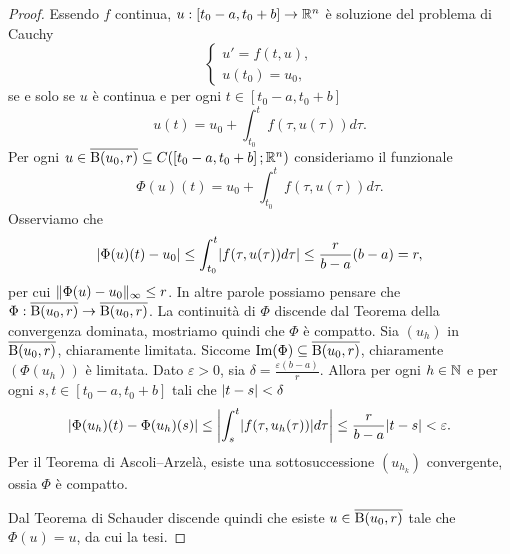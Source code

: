 \begin{proof}
	Essendo $f$ continua, $u: \left[t_{0} - a,t_{0}+b\right] \to \R^{n}$ è soluzione del problema di Cauchy \[ \begin{cases}
		u' = f(t,u), \\
		u(t_{0}) = u_{0},
	\end{cases} \]
	se e solo se $u$ è continua e per ogni $t \in \left[t_{0} - a,t_{0}+b\right]$
	\[ u(t) = u_0 + \int_{t_0}^{t} f(\tau,u(\tau)) d\tau.\]
	Per ogni $u \in \overline{\B(u_0,r)} \subseteq C(\left[t_{0} - a,t_{0}+b\right];\R^n)$ consideriamo il funzionale
	\[ \Phi(u)(t) = u_0 + \int_{t_0}^{t} f(\tau,u(\tau)) d\tau. \]
	Osserviamo che 
	\begin{align*}
		\abs{\Phi(u)(t) - u_0} \le\int_{t_0}^{t}\abs{f(\tau,u(\tau))d\tau}\le \frac{r}{b-a}(b-a) = r,
	\end{align*}
	per cui $\norm{\Phi(u) - u_0}_\infty \le r$. In altre parole possiamo pensare che $\Phi:\overline{\B(u_0,r)} \to \overline{\B(u_0,r)}$. La continuità di $\Phi$ discende dal Teorema della convergenza dominata, mostriamo quindi che $\Phi$ è compatto. Sia $(u_h)$ in $\overline{\B(u_0,r)}$, chiaramente limitata. Siccome $\textup{Im}(\Phi) \subseteq \overline{\B(u_0,r)}$, chiaramente $(\Phi(u_h))$ è limitata. Dato $\varepsilon > 0$, sia $\delta = \frac{\varepsilon(b-a)}{r}$. Allora per ogni $h \in \N$ e per ogni $s,t \in \left[t_{0} - a,t_{0}+b\right]$ tali che $\abs{t-s} < \delta$
	\[ \abs{\Phi(u_h)(t) - \Phi(u_h)(s)} \le \abs*{\int_{s}^{t}\abs{f(\tau,u_h(\tau))}d\tau} \le \frac{r}{b-a}\abs{t-s} < \varepsilon.\]
	Per il Teorema di Ascoli--Arzelà, esiste una sottosuccessione $(u_{h_k})$ convergente, ossia $\Phi$ è compatto. 
	
	Dal Teorema di Schauder discende quindi che esiste $u \in \overline{\B(u_0,r)}$ tale che $\Phi(u) = u$, da cui la tesi.
\end{proof}

